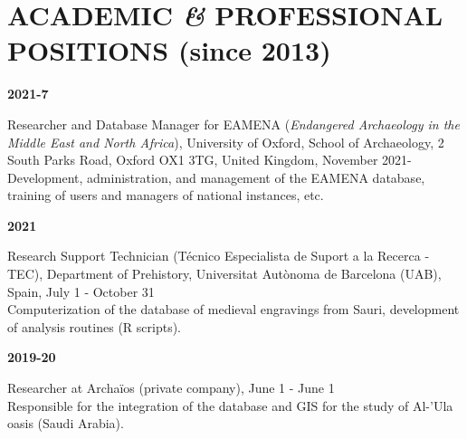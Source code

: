 \documentclass{article}
\newcommand{\fr}[1]{} %
\newcommand{\en}[1]{#1}   %
\begin{document}
\section{\fr{POSTES ACADÉMIQUES \textit{\&} PROFESSIONNELS (depuis 2013)}\en{ACADEMIC \textit{\&} PROFESSIONAL POSITIONS (since 2013)}}

\textbf{2021-7} 
\fr{Chercheur et responsable de la base de données EAMENA (\textit{Endangered Archaeology in the Middle East and North Africa}), Université d'Oxford, School of Archaeology, 2 South Parks Road, Oxford OX1 3TG, Royaume-Uni, novembre 2021-\\
\hspace*{0.5cm} Développement, administration et gestion de la base de données EAMENA, formation des utilisateurs et des gestionnaires des instances nationales, etc.}
\en{Researcher and Database Manager for EAMENA (\textit{Endangered Archaeology in the Middle East and North Africa}), University of Oxford, School of Archaeology, 2 South Parks Road, Oxford OX1 3TG, United Kingdom, November 2021-\\
\hspace*{0.5cm} Development, administration, and management of the EAMENA database, training of users and managers of national instances, etc.}

\smallbreak
\textbf{2021} 
\fr{Technicien de Support à la recherche (Técnico Especialista de Suport a la Recerca - TEC), Département de Préhistoire, Universitat Autònoma de Barcelona (UAB), Espagne, 1er juillet-31 octobre \\
\hspace*{0.5cm} Informatisation de la base de données des gravures médiévales de Sauri, développement de routines d'analyses (scripts R).}
\en{Research Support Technician (Técnico Especialista de Suport a la Recerca - TEC), Department of Prehistory, Universitat Autònoma de Barcelona (UAB), Spain, July 1 - October 31 \\
\hspace*{0.5cm} Computerization of the database of medieval engravings from Sauri, development of analysis routines (R scripts).}

\smallbreak
\textbf{2019-20} 
\fr{Chercheur Archaïos (compagnie privée), 1er juin - 1er juin \\
\hspace*{0.5cm} Chargé de l'intégration de la base de données et du SIG pour l'étude de l'oasis d'Al-'Ula (Arabie Saoudite).}
\en{Researcher at Archaïos (private company), June 1 - June 1 \\
\hspace*{0.5cm} Responsible for the integration of the database and GIS for the study of Al-'Ula oasis (Saudi Arabia).}
\end{document}
